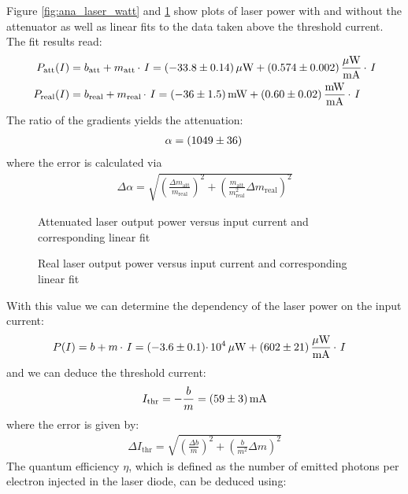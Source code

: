 \documentclass{protokoll_en}
\begin{document}
Figure \ref{fig:ana_laser_watt} and \ref{fig:ana_laser_woatt} show plots of laser power with and without the attenuator as well as linear fits to the data taken above the threshold current. The fit results read:
\begin{align}
P_\textrm{att}(I) &= b_\textrm{att} + m_\textrm{att} \,\cdotp\, I = \unit[(-33.8 \pm 0.14)]{\mu W} + \unit[(0.574 \pm 0.002
)]{\frac{\mu W}{mA}}\,\cdotp\, I\\
P_\textrm{real}(I) &= b_\textrm{real} + m_\textrm{real} \,\cdotp\, I =\unit[(-36 \pm 1.5)]{mW} + \unit[(0.60 \pm 0.02
)]{\frac{mW}{mA}}\,\cdotp\, I
\end{align}
The ratio of the gradients yields the attenuation:
\begin{align}
\alpha = \unit[(1049 \pm 36)]{}
\end{align}
where the error is calculated via
\begin{align*}
\Delta \alpha = \sqrt{\left(\frac{\Delta m_\textrm{att}}{m_\textrm{real}}\right)^2 + \left(\frac{m_\textrm{att}}{m^2_\textrm{real}}\Delta m_\textrm{real}\right)^2}
\end{align*}
\begin{figure}[H]
\begin{floatrow}
\ffigbox[0.5\textwidth]{}
{
\resizebox{0.5\textwidth}{!}{
	
}
	\caption{Attenuated laser output power versus input current and corresponding linear fit}
	\label{fig:ana_laser_watt}
}
\ffigbox[0.5\textwidth]{}
{
\resizebox{0.5\textwidth}{!}{
	
}
	\caption{Real laser output power versus input current and corresponding linear fit}
	\label{fig:ana_laser_woatt}
}
\end{floatrow}
\end{figure}
With this value we can determine the dependency of the laser power on the input current:
\begin{align}
P(I) &= b + m\,\cdotp\, I=\unit[(-3.6 \pm 0.1)\cdotp 10^{4}]{\mu W} + \unit[(602 \pm 21)]{\frac{\mu W}{mA}}\,\cdotp\, I
\end{align}
and we can deduce the threshold current:
\begin{align}
I_\textrm{thr} = -\frac{b}{m} = \unit[(59 \pm 3)]{mA}
\end{align}
where the error is given by:
\begin{align}
\Delta I_\textrm{thr} = \sqrt{\left(\frac{\Delta b}{m}\right)^2+\left(\frac{b}{m^2}\Delta m\right)^2}
\end{align}
The quantum efficiency $\eta$, which is defined as the number of emitted photons per electron injected in the laser diode, can be deduced using:
\end{document}
